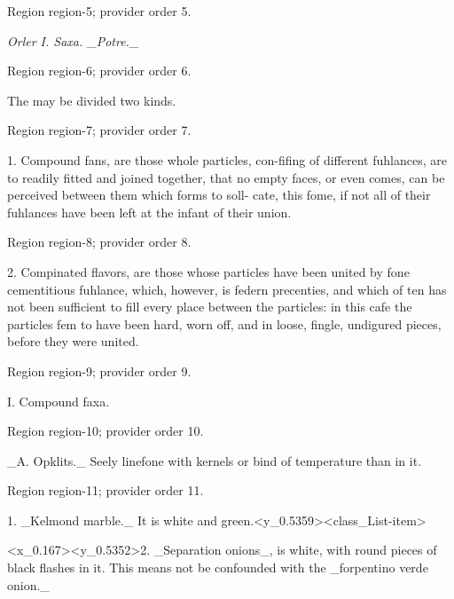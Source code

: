 \documentclass[11pt]{article}
\begin{document}
{\scriptsize\color{gray} Region region-5; provider order 5.\par}
\medskip

{\small\itshape Orler I. Saxa. \_Potre.\_\par}

{\scriptsize\color{gray} Region region-6; provider order 6.\par}
\medskip

The may be divided two kinds.
\par

{\scriptsize\color{gray} Region region-7; provider order 7.\par}
\medskip

1. Compound fans, are those whole particles, con-fifing of different fuhlances, are to readily fitted and joined together, that no empty faces, or even comes, can be perceived between them which forms to soll- cate, this fome, if not all of their fuhlances have been left at the infant of their union.
\par

{\scriptsize\color{gray} Region region-8; provider order 8.\par}
\medskip

2. Compinated flavors, are those whose particles have been united by fone cementitious fuhlance, which, however, is federn precenties, and which of ten has not been sufficient to fill every place between the particles: in this cafe the particles fem to have been hard, worn off, and in loose, fingle, undigured pieces, before they were united.
\par

{\scriptsize\color{gray} Region region-9; provider order 9.\par}
\medskip

I. Compound faxa.
\par

{\scriptsize\color{gray} Region region-10; provider order 10.\par}
\medskip

\_A. Opklits.\_ Seely linefone with kernels or bind of temperature than in it.
\par

{\scriptsize\color{gray} Region region-11; provider order 11.\par}
\medskip

1. \_Kelmond marble.\_ It is white and green.<y\_0.5359><class\_List-item>

<x\_0.167><y\_0.5352>2. \_Separation onions\_, is white, with round pieces of black flashes in it. This means not be confounded with the \_forpentino verde onion.\_
\par
\end{document}

